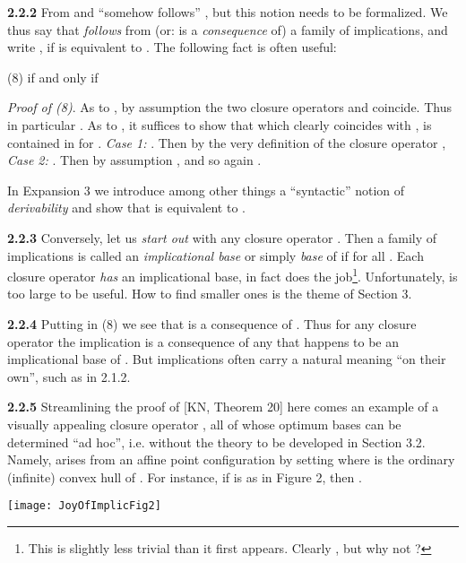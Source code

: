 \documentclass[11pt]{article}
\begin{document}
{\bf 2.2.2} From  and  ``somehow follows'' , but this notion needs to be formalized. We thus say that  {\it follows} from (or: is a {\it consequence} of) a family  of implications, and write , if  is equivalent to . The following fact is often useful:

(8) \quad  if and only if 

{\it Proof of (8)}. As to , by assumption the two closure operators  and  coincide. Thus in particular . As to , it suffices to show that  which clearly coincides with , is contained in  for . {\it Case 1:} . Then  by the very definition of the closure operator , {\it Case 2:} . Then by assumption , and so again . \quad 

In Expansion 3 we introduce among other things a ``syntactic'' notion  of {\it derivability} and show that  is equivalent to .


{\bf 2.2.3}  Conversely, let  us {\it start out} with any closure operator . Then a family  of implications is called an {\it implicational base} or simply {\it base} of  if  for all . Each closure operator  {\it has} an implicational base, in fact  does the job\footnote{This is slightly less trivial than it first appears.  Clearly , but why not ?}. Unfortunately,  is too large to be useful. How to find smaller ones is the theme of Section 3.  





{\bf 2.2.4} Putting  in (8) we see that  is a consequence of . 
Thus for any closure operator  the implication  is a consequence of any  that happens to be an implicational base of . But implications  often carry a natural meaning ``on their own'', such as  in 2.1.2.


{\bf 2.2.5} Streamlining the proof of [KN, Theorem 20] here comes an example of a visually appealing closure operator , all of whose optimum bases can be determined ``ad hoc'', i.e. without the theory to be developed in Section 3.2. Namely,  arises from an affine point configuration  by setting  where  is the ordinary (infinite) convex hull of . For instance, if  is as in Figure 2, then .


\begin{center}
\texttt{[image: JoyOfImplicFig2]}
\end{center}
\end{document}
